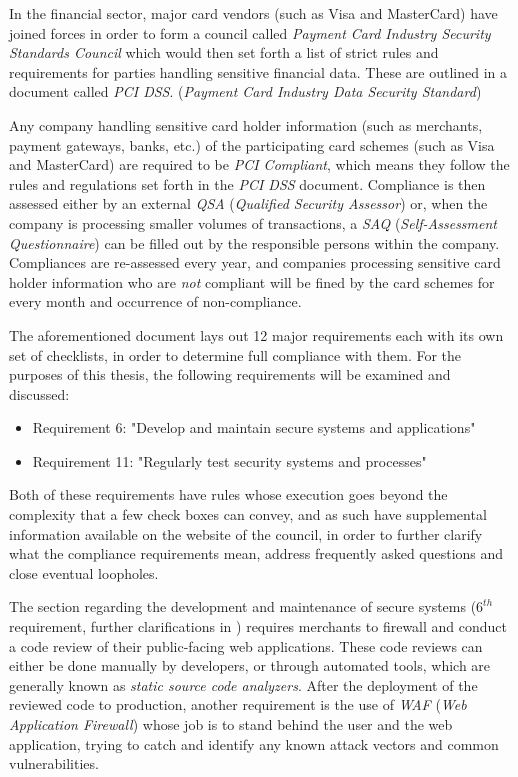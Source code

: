 \documentclass[a4paper,12pt]{article}
\begin{document}
	In the financial sector, major card vendors (such as Visa and MasterCard) have joined forces in order to form a council called \textit{Payment Card Industry Security Standards Council} which would then set forth a list of strict rules and requirements for parties handling sensitive financial data. These are outlined in a document called \textit{PCI DSS}. (\textit{Payment Card Industry Data Security Standard})
	
	Any company handling sensitive card holder information (such as merchants, payment gateways, banks, etc.) of the participating card schemes (such as Visa and MasterCard) are required to be \textit{PCI Compliant}, which means they follow the rules and regulations set forth in the \textit{PCI DSS} document. Compliance is then assessed either by an external \textit{QSA} (\textit{Qualified Security Assessor}) or, when the company is processing smaller volumes of transactions, a \textit{SAQ} (\textit{Self-Assessment Questionnaire}) can be filled out by the responsible persons within the company. Compliances are re-assessed every year, and companies processing sensitive card holder information who are \textit{not} compliant will be fined by the card schemes for every month and occurrence of non-compliance.\cite{wfargo15}
	
	The aforementioned document lays out 12 major requirements\cite{pcidss31} each with its own set of checklists, in order to determine full compliance with them. For the purposes of this thesis, the following requirements will be examined and discussed:
	
	\vspace{-0.15in}
	\begin{itemize}
		\item Requirement 6: "Develop and maintain secure systems and applications"
		\item Requirement 11: "Regularly test security systems and processes"
	\end{itemize}
	\vspace{-0.15in}
	
	Both of these requirements have rules whose execution goes beyond the complexity that a few check boxes can convey, and as such have supplemental information available on the website of the council, in order to further clarify what the compliance requirements mean, address frequently asked questions and close eventual loopholes.
	
	The section regarding the development and maintenance of secure systems ($6^{th}$ requirement, further clarifications in \cite{pcireq6}) requires merchants to firewall and conduct a code review of their public-facing web applications. These code reviews can either be done manually by developers, or through automated tools, which are generally known as \textit{static source code analyzers}. After the deployment of the reviewed code to production, another requirement is the use of \textit{WAF} (\textit{Web Application Firewall}) whose job is to stand behind the user and the web application, trying to catch and identify any known attack vectors and common vulnerabilities.
	
\end{document}
